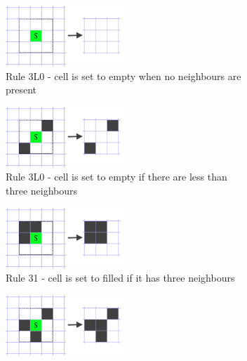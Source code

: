 \documentclass[12pt]{report}
\begin{document}
\begin{figure}[h]
	\centering
	\begin{subfigure}[t]{0.4\textwidth}
		\centering
		\includegraphics[width=0.5\textwidth]{images/rule0dead}
		\caption{Rule 3L0 - cell is set to empty when no neighbours are present} 
	\end{subfigure} \hspace{1em}
	\hfill
	\begin{subfigure}[t]{0.4\textwidth}
		\centering
		\includegraphics[width=0.5\textwidth]{images/rule2dead}
		\caption{Rule 3L0 - cell is set to empty if there are less than three neighbours} 
	\end{subfigure} \hspace{1em} 
	\hfill
	\begin{subfigure}[t]{0.4\textwidth}
		\centering
		\includegraphics[width=0.5\textwidth]{images/rule3alive}
		\caption{Rule 31 - cell is set to filled if it has three neighbours} 
	\end{subfigure} \hspace{1em} 
	\hfill
	\begin{subfigure}[t]{0.4\textwidth}
		\centering
		\includegraphics[width=0.5\textwidth]{images/rule3alive2}

\end{subfigure}
\end{figure}
\end{document}
